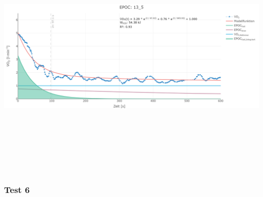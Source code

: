 \documentclass[
  letterpaper,
  DIV=11]{scrartcl}
\begin{document}
\includegraphics[width=11.45833in,height=4.6875in]{images/13_5.png}

\subsubsection{Test 6}
\end{document}
